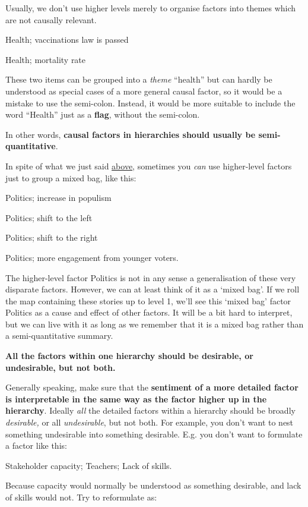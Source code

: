 \documentclass[
]{book}
\begin{document}
Usually, we don't use higher levels merely to organise factors into themes which are not causally relevant.

Health; vaccinations law is passed

Health; mortality rate

These two items can be grouped into a \emph{theme} ``health'' but can hardly be understood as special cases of a more general causal factor, so it would be a mistake to use the semi-colon. Instead, it would be more suitable to include the word ``Health'' just as a \textbf{flag}, without the semi-colon.

In other words, \textbf{causal factors in hierarchies should usually be semi-quantitative}.

In spite of what we just said \protect\hyperlink{higher-level-factors-are-generalisations}{above}, sometimes you \emph{can} use higher-level factors just to group a mixed bag, like this:

Politics; increase in populism

Politics; shift to the left

Politics; shift to the right

Politics; more engagement from younger voters.

The higher-level factor Politics is not in any sense a generalisation of these very disparate factors. However, we can at least think of it as a `mixed bag'. If we roll the map containing these stories up to level 1, we'll see this `mixed bag' factor Politics as a cause and effect of other factors. It will be a bit hard to interpret, but we can live with it as long as we remember that it is a mixed bag rather than a semi-quantitative summary.

\textbf{All the factors within one hierarchy should be desirable, or undesirable, but not both.}

Generally speaking, make sure that the \textbf{sentiment of a more detailed factor is interpretable in the same way as the factor higher up in the hierarchy}. Ideally \emph{all} the detailed factors within a hierarchy should be broadly \emph{desirable,} or all \emph{undesirable}, but not both. For example, you don't want to nest something undesirable into something desirable. E.g. you don't want to formulate a factor like this:

Stakeholder capacity; Teachers; Lack of skills.

Because capacity would normally be understood as something desirable, and lack of skills would not. Try to reformulate as:
\end{document}
